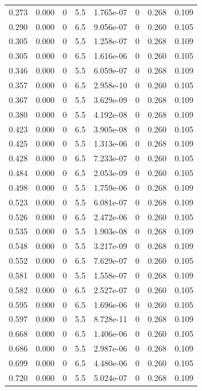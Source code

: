 \documentclass[preview]{standalone}
\begin{document}
{{\begin{tabular}{L{1.2cm}C{1.2cm} C{0.3cm}C{0.5cm} C{1.4cm}C{1.4cm} C{1.4cm}C{1.4cm}}
  0.273  &  0.000  & 0     & 5.5 &  1.765e-07  & 0  & 0.268 &  0.109   \\ 
  0.290  &  0.000  & 0     & 6.5 &  9.056e-07  & 0  & 0.260 &  0.105   \\ 
  0.305  &  0.000  & 0     & 5.5 &  1.258e-07  & 0  & 0.268 &  0.109   \\ 
  0.305  &  0.000  & 0     & 6.5 &  1.616e-06  & 0  & 0.260 &  0.105   \\ 
  0.346  &  0.000  & 0     & 5.5 &  6.059e-07  & 0  & 0.268 &  0.109   \\ 
  0.357  &  0.000  & 0     & 6.5 &  2.958e-10  & 0  & 0.260 &  0.105   \\ 
  0.367  &  0.000  & 0     & 5.5 &  3.629e-09  & 0  & 0.268 &  0.109   \\ 
  0.380  &  0.000  & 0     & 5.5 &  4.192e-08  & 0  & 0.268 &  0.109   \\ 
  0.423  &  0.000  & 0     & 6.5 &  3.905e-08  & 0  & 0.260 &  0.105   \\ 
  0.425  &  0.000  & 0     & 5.5 &  1.313e-06  & 0  & 0.268 &  0.109   \\ 
  0.428  &  0.000  & 0     & 6.5 &  7.233e-07  & 0  & 0.260 &  0.105   \\ 
  0.484  &  0.000  & 0     & 6.5 &  2.053e-09  & 0  & 0.260 &  0.105   \\ 
  0.498  &  0.000  & 0     & 5.5 &  1.759e-06  & 0  & 0.268 &  0.109   \\ 
  0.523  &  0.000  & 0     & 5.5 &  6.081e-07  & 0  & 0.268 &  0.109   \\ 
  0.526  &  0.000  & 0     & 6.5 &  2.472e-06  & 0  & 0.260 &  0.105   \\ 
  0.535  &  0.000  & 0     & 5.5 &  1.903e-08  & 0  & 0.268 &  0.109   \\ 
  0.548  &  0.000  & 0     & 5.5 &  3.217e-09  & 0  & 0.268 &  0.109   \\ 
  0.552  &  0.000  & 0     & 6.5 &  7.629e-07  & 0  & 0.260 &  0.105   \\ 
  0.581  &  0.000  & 0     & 5.5 &  1.558e-07  & 0  & 0.268 &  0.109   \\ 
  0.582  &  0.000  & 0     & 6.5 &  2.527e-07  & 0  & 0.260 &  0.105   \\ 
  0.595  &  0.000  & 0     & 6.5 &  1.696e-06  & 0  & 0.260 &  0.105   \\ 
  0.597  &  0.000  & 0     & 5.5 &  8.728e-11  & 0  & 0.268 &  0.109   \\ 
  0.668  &  0.000  & 0     & 6.5 &  1.406e-06  & 0  & 0.260 &  0.105   \\ 
  0.686  &  0.000  & 0     & 5.5 &  2.987e-06  & 0  & 0.268 &  0.109   \\ 
  0.699  &  0.000  & 0     & 6.5 &  4.480e-06  & 0  & 0.260 &  0.105   \\ 
  0.720  &  0.000  & 0     & 5.5 &  5.024e-07  & 0  & 0.268 &  0.109   \\ 
\hline 
\end{tabular} 

}}
\end{document}
